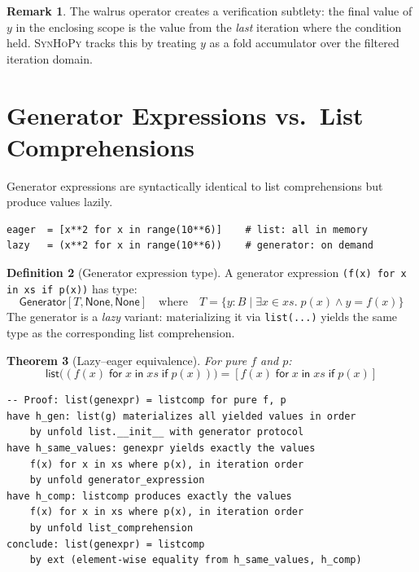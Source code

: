 \documentclass[11pt,a4paper]{report}
\theoremstyle{definition}
\newtheorem{definition}{Definition}[chapter]
\newtheorem{remark}[definition]{Remark}
\theoremstyle{plain}
\newtheorem{theorem}[definition]{Theorem}
\newcommand{\synhopy}{\textsc{SynHoPy}}
\begin{document}
\begin{remark}
The walrus operator creates a verification subtlety: the final value of $y$
in the enclosing scope is the value from the \emph{last} iteration where the
condition held.  \synhopy{} tracks this by treating $y$ as a fold accumulator
over the filtered iteration domain.
\end{remark}

\section{Generator Expressions vs.\ List Comprehensions}

Generator expressions are syntactically identical to list comprehensions but
produce values lazily.

\begin{lstlisting}[style=python]
eager  = [x**2 for x in range(10**6)]    # list: all in memory
lazy   = (x**2 for x in range(10**6))    # generator: on demand
\end{lstlisting}

\begin{definition}[Generator expression type]
A generator expression \lstinline[style=python]|(f(x) for x in xs if p(x))|
has type:
\[
  \mathsf{Generator}[T, \mathsf{None}, \mathsf{None}]
  \quad\text{where}\quad
  T = \{y : B \mid \exists x \in \mathit{xs}.\; p(x) \wedge y = f(x)\}
\]
The generator is a \emph{lazy} variant: materializing it via
\lstinline[style=python]|list(...)| yields the same type as the
corresponding list comprehension.
\end{definition}

\begin{theorem}[Lazy--eager equivalence]
\label{thm:lazy-eager}
For pure $f$ and $p$:
\[
  \mathsf{list}\bigl((f(x) \;\mathsf{for}\; x \;\mathsf{in}\;
  \mathit{xs} \;\mathsf{if}\; p(x))\bigr)
  = [f(x) \;\mathsf{for}\; x \;\mathsf{in}\; \mathit{xs}
    \;\mathsf{if}\; p(x)]
\]
\end{theorem}

\begin{lstlisting}[style=proof]
-- Proof: list(genexpr) = listcomp for pure f, p
have h_gen: list(g) materializes all yielded values in order
    by unfold list.__init__ with generator protocol
have h_same_values: genexpr yields exactly the values
    f(x) for x in xs where p(x), in iteration order
    by unfold generator_expression
have h_comp: listcomp produces exactly the values
    f(x) for x in xs where p(x), in iteration order
    by unfold list_comprehension
conclude: list(genexpr) = listcomp
    by ext (element-wise equality from h_same_values, h_comp)
\end{lstlisting}
\end{document}
